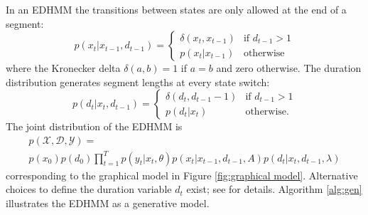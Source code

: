 In an EDHMM the transitions between states are only allowed at the end of a segment:
    \begin{equation}
        p(x_t | x_{t-1}, d_{t-1}) = 
        \begin{cases} 
            \delta(x_t, x_{t-1}) & \textrm{if $d_{t-1} > 1$} \\
            p(x_t | x_{t-1}) & \textrm{otherwise}
        \end{cases}
    \end{equation}
where the Kronecker delta $\delta(a,b) = 1$ if $a=b$ and zero otherwise. The duration distribution generates segment lengths at every state switch:
    \begin{equation}
        p(d_t | x_{t}, d_{t-1}) = 
        \begin{cases} 
            \delta(d_t, d_{t-1}-1) & \textrm{if $d_{t-1} > 1$} \\
            p(d_t | x_{t}) & \textrm{otherwise.}
        \end{cases}
    \end{equation}
The joint distribution of the EDHMM is 
\begin{multline}
    \label{eq:joint}
    p(\mathcal{X},\mathcal{D},\mathcal{Y}) =  \\ 
    p(x_0)p(d_0)\prod_{t=1}^T p(y_t | x_t, \theta) p(x_t | x_{t-1}, d_{t-1}, A) p(d_t | x_{t}, d_{t-1}, \lambda)
\end{multline}
corresponding to the graphical model in Figure \ref{fig:graphical model}. Alternative choices to define the duration variable $d_t$ exist; see \cite{Chiappa2011} for details. Algorithm \ref{alg:gen} illustrates the EDHMM as a generative model.